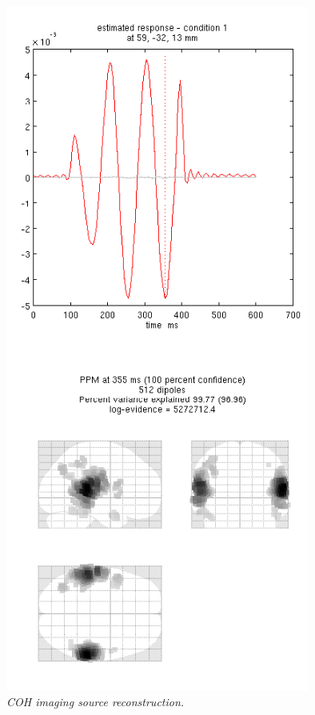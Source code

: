 \begin{figure}
\begin{center}
\includegraphics[width=100mm]{meg_sloc/slide5}
\caption{\em COH imaging source reconstruction.\label{meg_sloc:fig:5}}
\end{center}
\end{figure}





